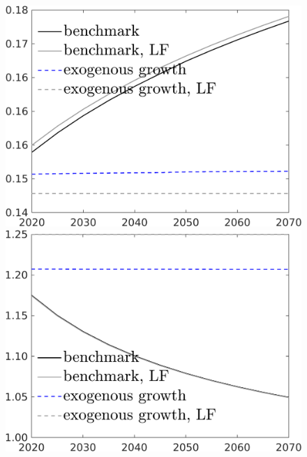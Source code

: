 \begin{figure}[h!!]
\begin{minipage}[]{0.32\textwidth}
 	\end{minipage}
 	\begin{minipage}[]{0.32\textwidth}
 		\includegraphics[width=1\textwidth]{../../codding_model/own_basedOnFried/optimalPol_190722_tidiedUp/figures/all_10Aout22/CountXgrTaulLF_target_LgLf_spillover0_sep1_extern0_PV1_etaa0.79_lgd1.png}
 	\end{minipage}
 	\begin{minipage}[]{0.32\textwidth}
 		\includegraphics[width=1\textwidth]{../../codding_model/own_basedOnFried/optimalPol_190722_tidiedUp/figures/all_10Aout22/CountXgrTaulLF_target_pg_spillover0_sep1_extern0_PV1_etaa0.79_lgd1.png}

\end{minipage}
\end{figure}
